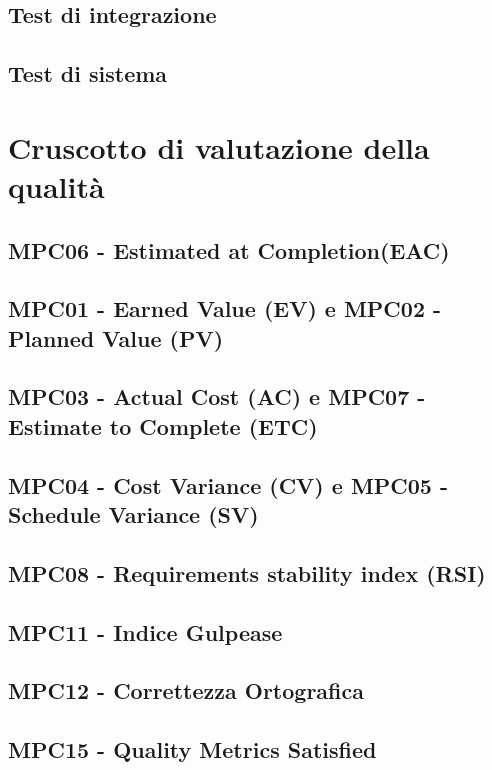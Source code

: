 \documentclass[italian,12pt]{article} %
\begin{document}
\subsection{Test di integrazione}

\subsection{Test di sistema}

\newpage

\section{Cruscotto di valutazione della qualità}

\subsection{MPC06 - Estimated at Completion(EAC)}

\subsection{MPC01 - Earned Value (EV) e MPC02 - Planned Value (PV)}

\subsection{MPC03 - Actual Cost (AC) e MPC07 - Estimate to Complete (ETC)}

\subsection{MPC04 - Cost Variance (CV) e MPC05 - Schedule Variance (SV)}

\subsection{MPC08 - Requirements stability index (RSI)}

\subsection{MPC11 - Indice Gulpease}

\subsection{MPC12 - Correttezza Ortografica}

\subsection{MPC15 - Quality Metrics Satisfied}
\end{document}
